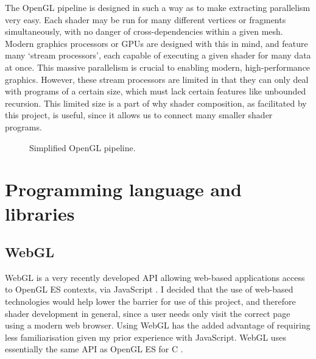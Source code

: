 \documentclass[12pt,twoside,notitlepage]{report}
\begin{document}
The OpenGL pipeline is designed in such a way as to make extracting parallelism very easy. Each shader may be run for many different vertices or fragments simultaneously, with no danger of cross-dependencies within a given mesh. Modern graphics processors or GPUs are designed with this in mind, and feature many `stream processors', each capable of executing a given shader for many data at once. This massive parallelism is crucial to enabling modern, high-performance graphics. However, these stream processors are limited in that they can only deal with programs of a certain size, which must lack certain features like unbounded recursion. This limited size is a part of why shader composition, as facilitated by this project, is useful, since it allows us to connect many smaller shader programs.
\begin{figure}
\centering
{}
\caption{Simplified OpenGL pipeline.\label{opengl-pipe}}
\end{figure}

\section{Programming language and libraries}

\subsection*{WebGL}
WebGL is a very recently developed API allowing web-based applications access to OpenGL ES contexts, via JavaScript \citep{webgl-spec}. I decided that the use of web-based technologies would help lower the barrier for use of this project, and therefore shader development in general, since a user needs only visit the correct page using a modern web browser. Using WebGL has the added advantage of requiring less familiarisation given my prior experience with JavaScript. WebGL uses essentially the same API as OpenGL ES for C \citep{webgl-spec}.
\end{document}
